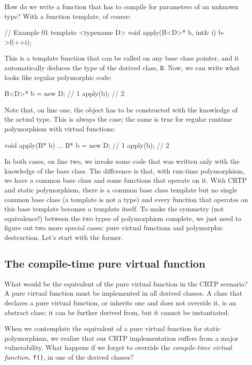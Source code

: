 How do we write a function that has to compile for parameters of an unknown type? With a function template, of course:

\begin{code}
// Example 01
template <typename D> void apply(B<D>* b, int& i) {
  b->f(++i);
}
\end{code}

This is a template function that can be called on any base class pointer, and it automatically deduces the type of the derived class, \texttt{D}. Now, we can write what looks like regular polymorphic code:

\begin{code}
B<D>* b = new D;    // 1
apply(b);         // 2
\end{code}

Note that, on line one, the object has to be constructed with the knowledge of the actual type. This is always the case; the same is true for regular runtime polymorphism with virtual functions:

\begin{code}
void apply(B* b) { ... }
B* b = new D;    // 1
apply(b);        // 2
\end{code}

In both cases, on line two, we invoke some code that was written only with the knowledge of the base class. The difference is that, with run-time polymorphism, we have a common base class and some functions that operate on it. With CRTP and static polymorphism, there is a common base class template but no single common base class (a template is not a type) and every function that operates on this base template becomes a template itself. To make the symmetry (not equivalence!) between the two types of polymorphism complete, we just need to figure out two more special cases: pure virtual functions and polymorphic destruction. Let's start with the former.

\subsection{The compile-time pure virtual function}

What would be the equivalent of the pure virtual function in the CRTP scenario? A pure virtual function must be implemented in all derived classes. A class that declares a pure virtual function, or inherits one and does not override it, is an abstract class; it can be further derived from, but it cannot be instantiated.

When we contemplate the equivalent of a pure virtual function for static polymorphism, we realize that our CRTP implementation suffers from a major vulnerability. What happens if we forget to override the \emph{compile-time virtual function,} \texttt{f()}, in one of the derived classes?

